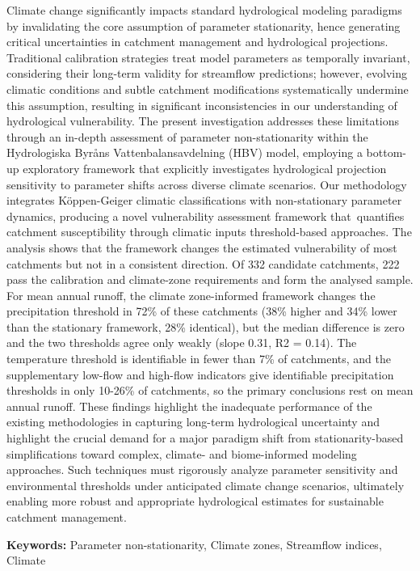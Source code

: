 \documentclass[
]{article}
\begin{document}
Climate change significantly impacts standard hydrological modeling
paradigms by invalidating the core assumption of parameter stationarity,
hence generating critical uncertainties in catchment management and
hydrological projections. Traditional calibration strategies treat model
parameters as temporally invariant, considering their long-term validity
for streamflow predictions; however, evolving climatic conditions and
subtle catchment modifications systematically undermine this assumption,
resulting in significant inconsistencies in our understanding of
hydrological vulnerability. The present investigation addresses these
limitations through an in-depth assessment of parameter non-stationarity
within the Hydrologiska Byråns Vattenbalansavdelning (HBV) model,
employing a bottom-up exploratory framework that explicitly investigates
hydrological projection sensitivity to parameter shifts across diverse
climate scenarios. Our methodology integrates Köppen-Geiger climatic
classifications with non-stationary parameter dynamics, producing a
novel vulnerability assessment framework that~quantifies catchment
susceptibility through climatic inputs threshold-based approaches. The
analysis shows that the framework changes the estimated vulnerability of
most catchments but not in a consistent direction. Of 332 candidate
catchments, 222 pass the calibration and climate-zone requirements and
form the analysed sample. For mean annual runoff, the climate
zone-informed framework changes the precipitation threshold in 72\% of
these catchments (38\% higher and 34\% lower than the stationary
framework, 28\% identical), but the median difference is zero and the
two thresholds agree only weakly (slope 0.31, R2 = 0.14). The
temperature threshold is identifiable in fewer than 7\% of catchments,
and the supplementary low-flow and high-flow indicators give
identifiable precipitation thresholds in only 10-26\% of catchments, so
the primary conclusions rest on mean annual runoff. These findings
highlight the inadequate performance of the existing methodologies in
capturing long-term hydrological uncertainty and highlight the crucial
demand for a major paradigm shift from stationarity-based
simplifications toward complex, climate- and biome-informed modeling
approaches. Such techniques must rigorously analyze parameter
sensitivity and environmental thresholds under anticipated climate
change scenarios, ultimately enabling more robust and appropriate
hydrological estimates for sustainable catchment management.

\textbf{Keywords:} Parameter non-stationarity, Climate zones, Streamflow
indices, Climate
\end{document}
